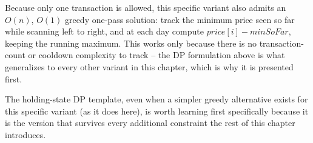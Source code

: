 \begin{ideabox}
Because only one transaction is allowed, this specific variant also
admits an $O(n)$, $O(1)$ greedy one-pass solution: track the minimum
price seen so far while scanning left to right, and at each day compute
$\textit{price}[i] - \textit{minSoFar}$, keeping the running maximum.
This works only because there is no transaction-count or cooldown
complexity to track -- the DP formulation above is what generalizes to
every other variant in this chapter, which is why it is presented first.
\end{ideabox}

\begin{takeawaybox}
The holding-state DP template, even when a simpler greedy alternative
exists for this specific variant (as it does here), is worth learning
first specifically because it is the version that survives every
additional constraint the rest of this chapter introduces.
\end{takeawaybox}
